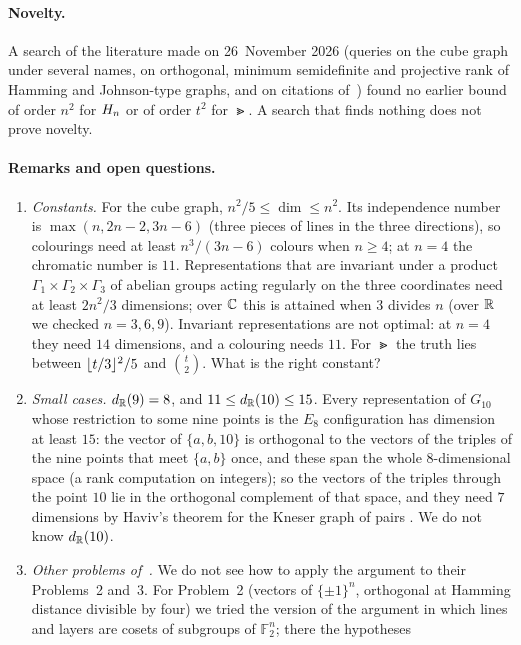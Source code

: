\paragraph{Novelty.}
A search of the literature made on 26~November 2026 (queries on the cube graph under several names, on
orthogonal, minimum semidefinite and projective rank of Hamming and Johnson-type graphs, and on citations
of~\cite{HI}) found no earlier bound of order $n^2$ for $H_n$ or of order $t^2$ for $\Gt$. A search that
finds nothing does not prove novelty.

\paragraph{Remarks and open questions.}
\begin{enumerate}
\item \emph{Constants.} For the cube graph, $n^2/5\le\dim\le n^2$. Its independence number is
$\max(n,2n-2,3n-6)$ (three pieces of lines in the three directions), so colourings need at least
$n^3/(3n-6)$ colours when $n\ge4$; at $n=4$ the chromatic number is $11$. Representations that are invariant under a product
$\Gamma_1\times\Gamma_2\times\Gamma_3$ of abelian groups acting regularly on the three coordinates need at least
$2n^2/3$ dimensions; over $\mathbb{C}$ this is attained when $3$ divides $n$ (over $\mathbb{R}$ we checked $n=3,6,9$).
Invariant representations are not optimal: at $n=4$ they need $14$ dimensions, and a colouring needs $11$. For $\Gt$ the truth
lies between $\lfloor t/3\rfloor^2/5$ and $\binom t2$. What is the right constant?
\item \emph{Small cases.} $d_{\mathbb{R}}(9)=8$, and $11\le d_{\mathbb{R}}(10)\le15$. Every representation of $G_{10}$ whose
restriction to some nine points is the $E_8$ configuration has dimension at least $15$: the vector of
$\{a,b,10\}$ is orthogonal to the vectors of the triples of the nine points that meet $\{a,b\}$ once, and
these span the whole $8$-dimensional space (a rank computation on integers); so the vectors of the triples
through the point $10$ lie in the orthogonal complement of that space, and they need $7$ dimensions by
Haviv's theorem for the Kneser graph of pairs \cite[Corollary~3.3]{Ha}. We do not know $d_{\mathbb{R}}(10)$.
\item \emph{Other problems of~\cite{HI}.} We do not see how to apply the argument to their Problems~2 and~3.
For Problem~2 (vectors of $\{\pm1\}^n$, orthogonal at Hamming distance divisible by four) we tried the version
of the argument in which lines and layers are cosets of subgroups of $\mathbb F_2^n$; there the hypotheses

\end{enumerate}

